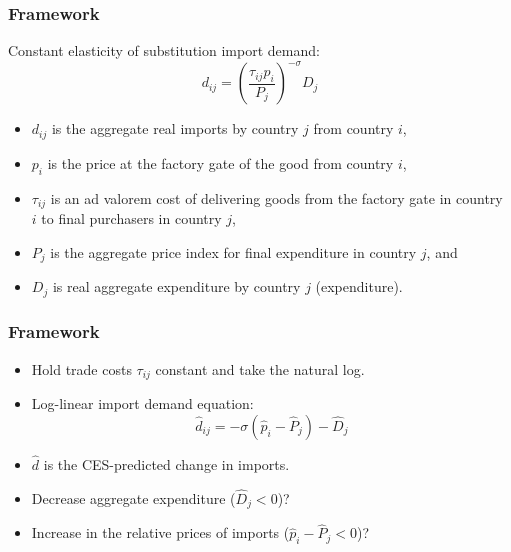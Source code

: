 \documentclass{beamer}
\begin{document}
\begin{frame}
  \frametitle{Framework}
  Constant elasticity of substitution import demand:
  \begin{equation*}
    d_{ij} = \left(\frac{\tau_{ij}p_i}{P_j}\right)^{-\sigma}D_j
  \end{equation*}
  \begin{itemize}
  \item \(d_{ij}\) is the aggregate real imports by country \(j\) from country \(i\),
  \item \(p_i\) is the price at the factory gate of the good from country \(i\),
  \item \(\tau_{ij}\) is an ad valorem cost of delivering goods from the factory gate in country \(i\) to final purchasers in country \(j\),
  \item \(P_j\) is the aggregate price index for final expenditure in country \(j\), and
  \item \(D_j\) is real aggregate expenditure by country \(j\) (expenditure).
  \end{itemize}
\end{frame}

\begin{frame}
  \frametitle{Framework}
  \begin{itemize}
    \item Hold trade costs \(\tau_{ij}\) constant and take the natural log.
      \item Log-linear import demand equation:
  \begin{equation*}
    \hat{d}_{ij} = - \sigma\left(\hat{p}_i-\hat{P}_j\right)-\hat{D}_j
  \end{equation*}
  \item \(\hat{d}\) is the CES-predicted change in imports.
  \item Decrease aggregate expenditure (\(\hat{D}_j<0\))?
  \item Increase in the relative prices of imports (\(\hat{p}_i-\hat{P}_j<0\))?
  \end{itemize}
\end{frame}
\end{document}
